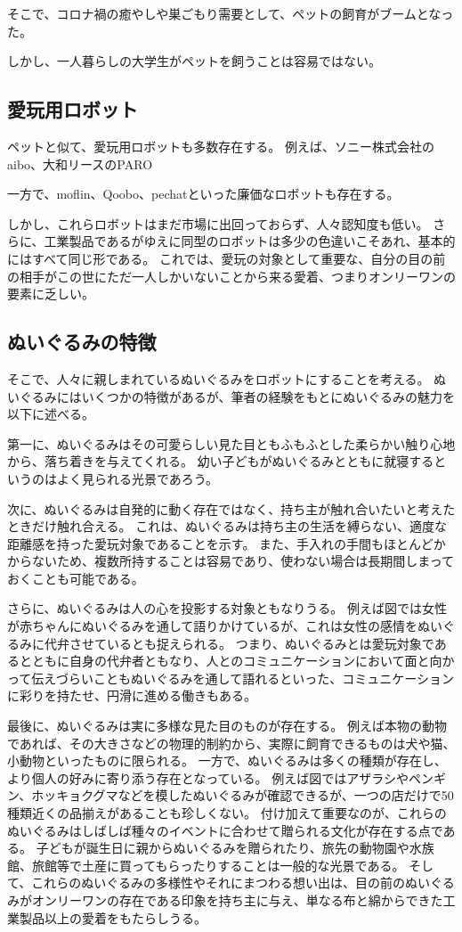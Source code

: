 \documentclass[uplatex,a4paper,12pt]{jsarticle}
\begin{document}
そこで、コロナ禍の癒やしや巣ごもり需要として、ペットの飼育がブームとなった。

しかし、一人暮らしの大学生がペットを飼うことは容易ではない。


\subsection{愛玩用ロボット}
ペットと似て、愛玩用ロボットも多数存在する。
例えば、ソニー株式会社のaibo、大和リースのPARO

一方で、moflin、Qoobo、pechatといった廉価なロボットも存在する。

しかし、これらロボットはまだ市場に出回っておらず、人々認知度も低い。
さらに、工業製品であるがゆえに同型のロボットは多少の色違いこそあれ、基本的にはすべて同じ形である。
これでは、愛玩の対象として重要な、自分の目の前の相手がこの世にただ一人しかいないことから来る愛着、つまりオンリーワンの要素に乏しい。


\subsection{ぬいぐるみの特徴}

そこで、人々に親しまれているぬいぐるみをロボットにすることを考える。
ぬいぐるみにはいくつかの特徴があるが、筆者の経験をもとにぬいぐるみの魅力を以下に述べる。

第一に、ぬいぐるみはその可愛らしい見た目ともふもふとした柔らかい触り心地から、落ち着きを与えてくれる。
幼い子どもがぬいぐるみとともに就寝するというのはよく見られる光景であろう。

次に、ぬいぐるみは自発的に動く存在ではなく、持ち主が触れ合いたいと考えたときだけ触れ合える。
これは、ぬいぐるみは持ち主の生活を縛らない、適度な距離感を持った愛玩対象であることを示す。
また、手入れの手間もほとんどかからないため、複数所持することは容易であり、使わない場合は長期間しまっておくことも可能である。

さらに、ぬいぐるみは人の心を投影する対象ともなりうる。
例えば図では女性が赤ちゃんにぬいぐるみを通して語りかけているが、これは女性の感情をぬいぐるみに代弁させているとも捉えられる。
つまり、ぬいぐるみとは愛玩対象であるとともに自身の代弁者ともなり、人とのコミュニケーションにおいて面と向かって伝えづらいこともぬいぐるみを通して語れるといった、コミュニケーションに彩りを持たせ、円滑に進める働きもある。

最後に、ぬいぐるみは実に多様な見た目のものが存在する。
例えば本物の動物であれば、その大きさなどの物理的制約から、実際に飼育できるものは犬や猫、小動物といったものに限られる。
一方で、ぬいぐるみは多くの種類が存在し、より個人の好みに寄り添う存在となっている。
例えば図ではアザラシやペンギン、ホッキョクグマなどを模したぬいぐるみが確認できるが、一つの店だけで50種類近くの品揃えがあることも珍しくない。
付け加えて重要なのが、これらのぬいぐるみはしばしば種々のイベントに合わせて贈られる文化が存在する点である。
子どもが誕生日に親からぬいぐるみを贈られたり、旅先の動物園や水族館、旅館等で土産に買ってもらったりすることは一般的な光景である。
そして、これらのぬいぐるみの多様性やそれにまつわる想い出は、目の前のぬいぐるみがオンリーワンの存在である印象を持ち主に与え、単なる布と綿からできた工業製品以上の愛着をもたらしうる。
\end{document}
